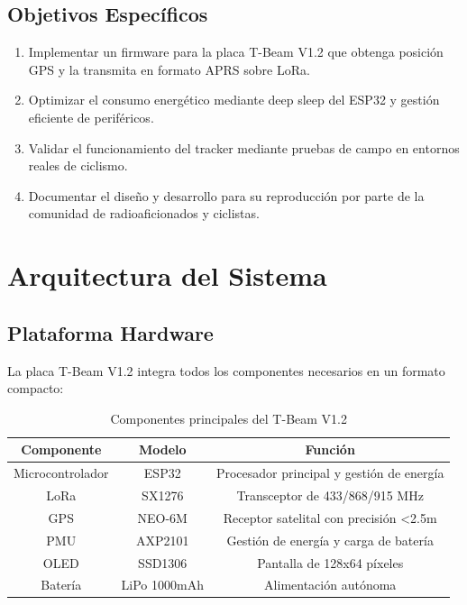 \documentclass[conference]{IEEEtran}
\begin{document}
\subsection{Objetivos Específicos}
\begin{enumerate}
    \item Implementar un firmware para la placa T-Beam V1.2 que obtenga posición GPS y la transmita en formato APRS sobre LoRa.
    \item Optimizar el consumo energético mediante deep sleep del ESP32 y gestión eficiente de periféricos.
    \item Validar el funcionamiento del tracker mediante pruebas de campo en entornos reales de ciclismo.
    \item Documentar el diseño y desarrollo para su reproducción por parte de la comunidad de radioaficionados y ciclistas.
\end{enumerate}

\section{Arquitectura del Sistema}

\subsection{Plataforma Hardware}

La placa T-Beam V1.2 integra todos los componentes necesarios en un formato compacto:

\begin{table}[H]
    \centering
    \caption{Componentes principales del T-Beam V1.2}
    \begin{tabular}{|c|c|c|}
        \hline
        \textbf{Componente} & \textbf{Modelo} & \textbf{Función} \\
        \hline
        Microcontrolador & ESP32 & Procesador principal y gestión de energía \\
        LoRa & SX1276 & Transceptor de 433/868/915 MHz \\
        GPS & NEO-6M & Receptor satelital con precisión \textless 2.5m \\
        PMU & AXP2101 & Gestión de energía y carga de batería \\
        OLED & SSD1306 & Pantalla de 128x64 píxeles \\
        Batería & LiPo 1000mAh & Alimentación autónoma \\
        \hline
    \end{tabular}
    
    \label{tab:hardware}
\end{table}
\end{document}
